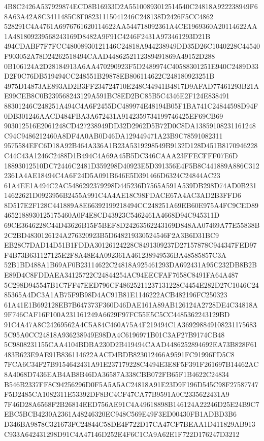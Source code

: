 \documentclass[UTF8,fontset=fandol,zihao=-4,a4paper]{ctexart}
\begin{document}
{{4B8C2426A537929874ECD8B16933D2A55100893012514540C24818A922238949F68A63A42A8C3411485C8F08231115041246C248138D2426F5CC4862
528291C4A4761A6976761620114622AA544718092361A4CE1969360A20114622AA1A481809239568243169D8482A9F91C4246F2431A973461293D21B
494CDABF7F7FCC48008930121146C24818A944238949DD35D26C1040228C44540F903052A78D24262518494CAAD4486252112389491869A49152D288
0B106124A2D28184913A6AA470290923F5D2489974C40588301251E940C2489D33D2F0C76DB519494CC248551B29878EB806114622C248180923251B
4975D14873AE893AD2B3FF234724710E248C44941B4817D9AFAD77461293B21AE99CEB8C0B239568243129A591BC8ED2BC85B5C4346E2F124E838491
88301246C248251A494C4A6F2455DC489974E48194B05F1BA741C24844598D94F0DB301246AACD484FBA3A672431A9142359734199746425EF69CB69
903012516E2061248CD427238949DD32D2962D5B72D0C8DA13859108231161248C94C9486212460A8DF4A0AB0D46DA129449471A23B9C78591082311
9575584EFC6D18A92B464A336A1B23A5319298549B9132D128D451B8170946228C44C43A1246C2488D1B494C4A69A45B5DC346CAAA23FFECFFF07E6D
18893012510DC72446C2481D359298D40923E5D391356E4F5B8C441889A886C3122361A4AE18494C4A6F24D5A091B646E5D391466D6324C24844AC23
61A4EE1A494C2AC5486292379298D445236D7565A591A539DB298D74AD0B23114622621D0923956B2455A991C4A4AE18C98FDACE67A4AC3AD2B3FFD6
8D517E2F128C441889A8E66392199218494CC248251A69EB60E975A4FC9CED894652188930125175460A0F4E8CD43923C5462461A4668D94C945311D
69CE3646228C44D43626B15F5BEF8D24263562243169D848AA07469A77E55838B2C2BD4830126124A276320923B5D648219330524546F2A3B6D31BC9
EB28C7DAD14D51B1FDDA30126124228C8491309237D27157878C944347FED97F4B73B631127125E2F8A48E4A092361A461238949536BA48585857C3A
52B1BD488A1B69AF0B23114622C24818A925461293DA692431A95C232DB8B2BE89D4C8FDDAEA34125722C24844254AC94EECFAF7658C8491FA64A487
5C298D945547B1C7FF47EED796CF48625211237131228C4454E282D27C1046C2485365A4DC3A1AB75F9B98D4AC91B81E1146222ACB482196FC250323
61A41E1B692128EB7B647373F360D46DAE161A89AB126124A2728DE4C34818A9F746CAF16F100A231161249A6629F97FC55E5C5CC4485362243129BD
91C4A47A8C24269562A4C5A84C460A75A4F219494C1A3692988491082311756835C95A0CC24818A936238949E98DA4C6196971B01C3AF27B9174CB48
5C9808231155CAA4104BDBA230D2B419494CAAD4486252894692EA73B828F61483B623E9AE91B836114622AACD4BDB823012466A9591FC91996FD5C8
7FCA6C34F27B9154642431A91E237179228C4494E3E8F5F391F261697B14462AC8A4068D7436EAB4AB8B46DA36587A338CBB072FB65F1B4622C24834
B546B2337FF8C94256296D0F5A5A5AC24818A91E23D9F196D545C98F27587747F5D2485CA1082311E53392DF8BC4CF47CA77B9591A0C2335622431A9
7F46D28A6568F2B26814EED756AE91C4A49618898B146124A22246D25E24B9C7EBC5BCB4230A2361A48246320EC948C569E49F3ED00430FB1ADBD3B6
D346BA9878C321673FC24844C58DE4F722D17CA47CF7BEAA1D411829AB913C933A642431298D91C4A47146D252E4F6C1CA9A62E1F722D176247D3212
}}
\end{document}
